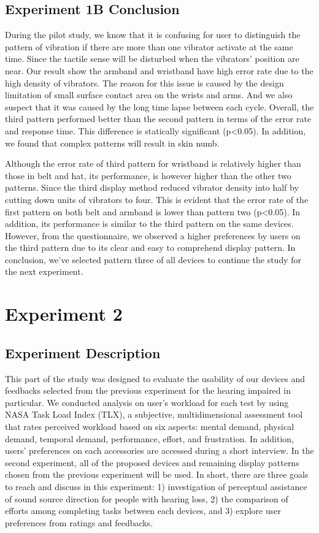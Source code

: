 \documentclass{sigchi}
\begin{document}
\subsection{Experiment 1B Conclusion}
During the pilot study, we know that it is confusing for user to distinguish the pattern of vibration if there are more than one vibrator activate at the same time. Since the tactile sense will be disturbed when the vibrators' position are near. Our result show the armband and wristband have high error rate due to the high density of vibrators. The reason for this issue is caused by the design limitation of small surface contact area on the wrists and arms. And we also suspect that it was caused by the long time lapse between each cycle. Overall, the third pattern performed better than the second pattern in terms of the error rate and response time. This difference is statically significant (p\textless0.05). In addition, we found that complex patterns will result in skin numb.

Although the error rate of third pattern for wristband is relatively higher than those in belt and hat, its performance, is however higher than the other two patterns. Since the third display method reduced vibrator density into half by cutting down units of vibrators to four. This is evident that the error rate of the first pattern on both belt and armband is lower than pattern two (p\textless0.05). In addition, its performance is similar to the third pattern on the same devices. However, from the questionnaire, we observed a higher preferences by users on the third pattern due to its clear and easy to comprehend display pattern. In conclusion, we've selected pattern three of all devices to continue the study for the next experiment.

\section{Experiment 2}
\subsection{Experiment Description}
This part of the study was designed to evaluate the usability of our devices and feedbacks selected from the previous experiment for the hearing impaired in particular. We conducted analysis on user's workload for each test by using NASA Task Load Index (TLX), a subjective, multidimensional assessment tool that rates perceived workload based on six aspects: mental demand, physical demand, temporal demand, performance, effort, and frustration. In addition, users’ preferences on each accessories are accessed during a short interview. In the second experiment, all of the proposed devices and remaining display patterns chosen from the previous experiment will be used. In short, there are three goals to reach and discuss in this experiment: 1) investigation of perceptual assistance of sound source direction for people with hearing loss, 2) the comparison of efforts among completing tasks between each devices, and 3) explore user preferences from ratings and feedbacks.
\end{document}
